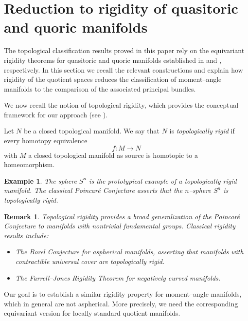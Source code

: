\documentclass[11pt,a4paper]{article}
\numberwithin{equation}{section}
\newtheorem{remark}[definition]{Remark}
\newtheorem{example}[definition]{Example}
\theoremstyle{named}
\begin{document}
\section{Reduction to rigidity of quasitoric and quoric manifolds}
\label{sec:reduction}

The topological classification results proved in this paper rely on the equivariant rigidity theorems for quasitoric and quoric manifolds established in \cite{mp} and \cite{gp}, respectively. In this section we recall the relevant constructions and explain how rigidity of the quotient spaces reduces the classification of moment--angle manifolds to the comparison of the associated principal bundles.

We now recall the notion of topological rigidity, which provides the conceptual framework for our approach (see \cite[Def.~7.1]{luck25}).

\begin{definition}
\label{def:rigidity}
Let $N$ be a closed topological manifold. We say that $N$ is \emph{topologically rigid} if every homotopy equivalence 
\[
f : M \longrightarrow N
\]
with $M$ a closed topological manifold as source is homotopic to a homeomorphism. 
\end{definition}

\begin{example}
The sphere $S^n$ is the prototypical example of a topologically rigid manifold.
The classical Poincaré Conjecture asserts that the $n$--sphere $S^n$ is topologically rigid.
\end{example}

\begin{remark}
Topological rigidity provides a broad generalization of the Poincar\'e Conjecture to manifolds with nontrivial fundamental groups. Classical rigidity results include:
\begin{itemize}
    \item[(1)] The Borel Conjecture for aspherical manifolds, asserting that manifolds with contractible universal cover are topologically rigid.
    \item[(2)] The Farrell--Jones Rigidity Theorem for negatively curved manifolds.
\end{itemize}
\end{remark}

Our goal is to establish a similar rigidity property for moment--angle manifolds, which in general are not aspherical. More precisely, we need the corresponding equivariant version for locally standard quotient manifolds.
\end{document}
